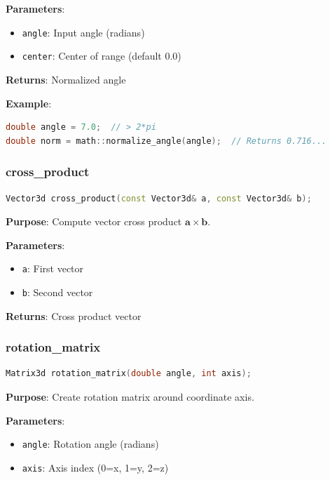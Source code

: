 \textbf{Parameters}:
\begin{itemize}
    \item \texttt{angle}: Input angle (radians)
    \item \texttt{center}: Center of range (default 0.0)
\end{itemize}

\textbf{Returns}: Normalized angle

\textbf{Example}:
\begin{lstlisting}[language=C++]
double angle = 7.0;  // > 2*pi
double norm = math::normalize_angle(angle);  // Returns 0.716...
\end{lstlisting}

\subsubsection{cross\_product}

\begin{lstlisting}[language=C++]
Vector3d cross_product(const Vector3d& a, const Vector3d& b);
\end{lstlisting}

\textbf{Purpose}: Compute vector cross product $\mathbf{a} \times \mathbf{b}$.

\textbf{Parameters}:
\begin{itemize}
    \item \texttt{a}: First vector
    \item \texttt{b}: Second vector
\end{itemize}

\textbf{Returns}: Cross product vector

\subsubsection{rotation\_matrix}

\begin{lstlisting}[language=C++]
Matrix3d rotation_matrix(double angle, int axis);
\end{lstlisting}

\textbf{Purpose}: Create rotation matrix around coordinate axis.

\textbf{Parameters}:
\begin{itemize}
    \item \texttt{angle}: Rotation angle (radians)
    \item \texttt{axis}: Axis index (0=x, 1=y, 2=z)
\end{itemize}

